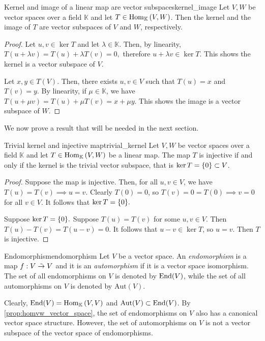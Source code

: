 \begin{proposition}{Kernel and image of a linear map are vector subspaces}{kernel_image}
    Let \(V, W\) be vector spaces over a field \(\mathbb{K}\) and let \(T \in \Hom[\mathbb{K}]{V,W}\). Then the kernel and the image of \(T\) are vector subspaces of \(V\) and \(W\), respectively.
\end{proposition}
\begin{proof}
    Let \(u, v \in \ker T\) and let \(\lambda \in \mathbb{K}\). Then, by linearity, \(T(u + \lambda v) = T(u) + \lambda T(v) = 0,\) therefore \(u + \lambda v \in \ker T\). This shows the kernel is a vector subspace of \(V\).

    Let \(x, y \in T(V)\). Then, there exists \(u, v \in V\) such that \(T(u) = x\) and \(T(v) = y\). By linearity, if \(\mu \in \mathbb{K}\), we have \(T(u + \mu v) = T(u) + \mu T(v) = x + \mu y\). This shows the image is a vector subspace of \(W\).
\end{proof}

We now prove a result that will be needed in the next section.
\begin{lemma}{Trivial kernel and injective map}{trivial_kernel}
    Let \(V, W\) be vector spaces over a field \(\mathbb{K}\) and let \(T\in\Hom[\mathbb{K}]{V,W}\) be a linear map. The map \(T\) is injective if and only if the kernel is the trivial vector subspace, that is \(\ker T = \set{0} \subset V\).
\end{lemma}
\begin{proof}
    Suppose the map is injective. Then, for all \(u, v \in V\), we have \(T(u) = T(v) \implies u = v\). Clearly \(T(0) = 0\), so \(T(v) = 0 = T(0) \implies v = 0\) for all \(v \in V\). It follows that \(\ker T = \set{0}.\)

    Suppose \(\ker T = \set{0}.\) Suppose \(T(u) = T(v)\) for some \(u, v \in V\). Then \(T(u) - T(v) = T(u-v) = 0\). It follows that \(u - v \in \ker T\), so \(u = v\). Then \(T\) is injective.
\end{proof}

\begin{definition}{Endomorphism}{endomorphism}
    Let \(V\) be a vector space. An \emph{endomorphism} is a map \(f : V \linear V\) and it is an \emph{automorphism} if it is a vector space isomorphism. The set of all endomorphisms on \(V\) is denoted by \(\End(V)\), while the set of all automorphisms on \(V\) is denoted by \(\mathrm{Aut}(V)\).
\end{definition}
\begin{remark}
    Clearly, \(\End(V) = \Hom[\mathbb{K}]{V,V}\) and \(\mathrm{Aut}(V) \subset \End(V)\). By \cref{prop:homvw_vector_space}, the set of endomorphisms on \(V\) also has a canonical vector space structure. However, the set of automorphisms on \(V\) is not a vector subspace of the vector space of endomorphisms.
\end{remark}

